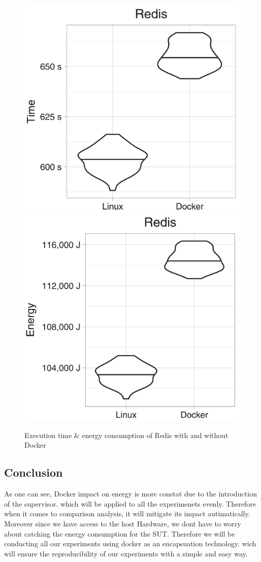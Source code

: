 \begin{figure}
    \includegraphics[width=.5\linewidth]{imgs/docker_vs_vm_energy_paper/reddis_time}
    \includegraphics[width=.5\linewidth]{imgs/docker_vs_vm_energy_paper/reddis_energy}
    \caption{Execution time \& energy consumption of Redis with and without Docker~\cite{santos2018does}}\label{fig:docker_reddis}
\end{figure}


\subsection{Conclusion}
As one can see, Docker impact on energy is more constat due to the introduction of the supervisor. which will be applied to all the experimenets evenly. Therefore when it comes to comparison analysis, it will mitigate its impact autimatically. 
Moreover since we have access to the host Hardware, we dont have to worry about catching the energy consumption for the SUT. 
Therefore we will be conducting all our experiments using docker as an encapsuation technology. wich will ensure the reproducibility of our experiments with a simple and easy way. 